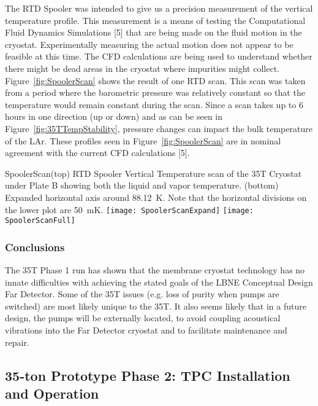 The RTD Spooler was intended to give us a precision measurement of the vertical temperature profile. 
This measurement is a means of testing the Computational Fluid Dynamics Simulations [5]\fixme{} that 
are being made on the fluid motion in the cryostat. Experimentally measuring the actual motion does not 
appear to be feasible at this time. The CFD calculations are being used to understand whether there 
might be dead areas in the cryostat where impurities might collect. Figure~\ref{fig:SpoolerScan} shows the result of one RTD 
scan. This scan was taken from a period where the barometric pressure was relatively constant so that 
the temperature would remain constant during the scan. Since a scan takes up to 6 hours in one direction 
(up or down) and as can be seen in Figure~\ref{fig:35TTempStability}, pressure changes can impact the 
bulk temperature of the LAr. These profiles seen in Figure~\ref{fig:SpoolerScan} are in nominal 
agreement with the current CFD calculations [5\fixme{}].


\begin{cdrfigure}{SpoolerScan}{(top) RTD Spooler Vertical Temperature scan of the 35T Cryostat under Plate B showing both the liquid and vapor temperature.  (bottom) Expanded horizontal axis around 88.12~K. Note that the horizontal divisions on the lower plot are 50~mK. }
\texttt{[image: SpoolerScanExpand]}  
\texttt{[image: SpoolerScanFull]}
\end{cdrfigure}

\subsubsection{Conclusions}

The 35T Phase 1 run has shown that the membrane cryostat technology has no innate difficulties with 
achieving the stated goals of the LBNE Conceptual Design Far Detector. Some of the 35T issues (e.g. loss 
of purity when pumps are switched) are most likely unique to the 35T. It also seems likely that in a future 
design, the pumps will be externally located, to avoid coupling acoustical vibrations into the Far Detector 
cryostat and to facilitate maintenance and repair.


\subsection{35-ton Prototype Phase 2: TPC Installation and Operation}

